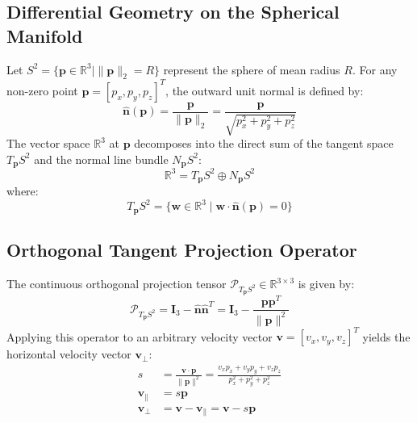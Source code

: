 \documentclass[10pt,journal,compsoc]{IEEEtran}
\begin{document}
\subsection{Differential Geometry on the Spherical Manifold}
Let $S^2 = \{ \mathbf{p} \in \mathbb{R}^3 \mid \|\mathbf{p}\|_2 = R \}$ represent the sphere of mean radius $R$. For any non-zero point $\mathbf{p} = [p_x, p_y, p_z]^T$, the outward unit normal is defined by:
\begin{equation}
\hat{\mathbf{n}}(\mathbf{p}) = \frac{\mathbf{p}}{\|\mathbf{p}\|_2} = \frac{\mathbf{p}}{\sqrt{p_x^2 + p_y^2 + p_z^2}}
\end{equation}
The vector space $\mathbb{R}^3$ at $\mathbf{p}$ decomposes into the direct sum of the tangent space $T_{\mathbf{p}}S^2$ and the normal line bundle $N_{\mathbf{p}}S^2$:
\begin{equation}
\mathbb{R}^3 = T_{\mathbf{p}}S^2 \oplus N_{\mathbf{p}}S^2
\end{equation}
where:
\begin{equation}
T_{\mathbf{p}}S^2 = \{ \mathbf{w} \in \mathbb{R}^3 \mid \mathbf{w} \cdot \hat{\mathbf{n}}(\mathbf{p}) = 0 \}
\end{equation}

\subsection{Orthogonal Tangent Projection Operator}
The continuous orthogonal projection tensor $\mathcal{P}_{T_{\mathbf{p}}S^2} \in \mathbb{R}^{3 \times 3}$ is given by:
\begin{equation}
\mathcal{P}_{T_{\mathbf{p}}S^2} = \mathbf{I}_3 - \hat{\mathbf{n}}\hat{\mathbf{n}}^T = \mathbf{I}_3 - \frac{\mathbf{p}\mathbf{p}^T}{\|\mathbf{p}\|^2}
\end{equation}
Applying this operator to an arbitrary velocity vector $\mathbf{v} = [v_x, v_y, v_z]^T$ yields the horizontal velocity vector $\mathbf{v}_\perp$:
\begin{align}
s &= \frac{\mathbf{v} \cdot \mathbf{p}}{\|\mathbf{p}\|^2} = \frac{v_x p_x + v_y p_y + v_z p_z}{p_x^2 + p_y^2 + p_z^2} \\
\mathbf{v}_\parallel &= s \mathbf{p} \\
\mathbf{v}_\perp &= \mathbf{v} - \mathbf{v}_\parallel = \mathbf{v} - s \mathbf{p}
\end{align}
\end{document}
